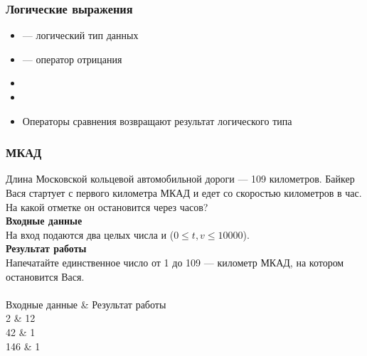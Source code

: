 \documentclass[PDF,10pt,usenames,dvipsnames,t,fragile]{beamer}
\newcommand{\inp}{\\ \vspace{5pt} {\bf Входные данные} \\ \vspace{5pt}} %
\newcommand{\out}{\\ \vspace{5pt} {\bf Результат работы} \\ \vspace{5pt}} %
\newcommand{\tb}{\\ \hline} %
\newenvironment{ex}{\\ \vspace{5pt}{\bf Пример} \\
\tabularx{\textwidth}{|X|X|}
\hline Входные данные & Результат работы \tb}{\endtabularx}
\begin{document}
\begin{frame}
	\frametitle{Логические выражения}
	\begin{itemize}
		\item {} --- логический тип данных
		\item \lcode{!} --- оператор отрицания
		\item {}
		\item {}
		\item Операторы сравнения возвращают результат логического типа
	\end{itemize}
\end{frame}

\begin{frame}
	\frametitle{МКАД}
	Длина Московской кольцевой автомобильной дороги  --- 109 километров. Байкер Вася
	стартует с первого километра МКАД и едет со скоростью  километров в час. На
	какой отметке он остановится через  часов?
	\inp
	На вход подаются два целых числа  и  ($0 \leq t,v \leq 10000$).
	\out
	Напечатайте единственное число от 1 до 109 --- километр МКАД, на котором остановится Вася.
	\begin{ex}
		60 2 & 12 \tb
		109 42 & 1 \tb
		0 146 & 1 \tb
	\end{ex}
\end{frame}
\end{document}
